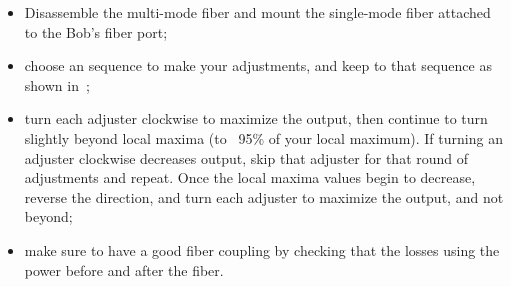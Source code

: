 \begin{itemize}
  \item Disassemble the multi-mode fiber and mount the single-mode fiber attached to the Bob's fiber port;
  \item choose an sequence to make your adjustments, and keep to that sequence as shown in~;
  \item turn each adjuster clockwise to maximize the output, then continue to turn slightly beyond local maxima (to ~95\% of your local maximum). If turning an adjuster clockwise decreases output, skip that adjuster for that round of adjustments and repeat. Once the local maxima values begin to decrease, reverse the direction, and turn each adjuster to maximize the output, and not beyond;
  \item make sure to have a good fiber coupling by checking that the losses using the power before and after the fiber.
\end{itemize}
